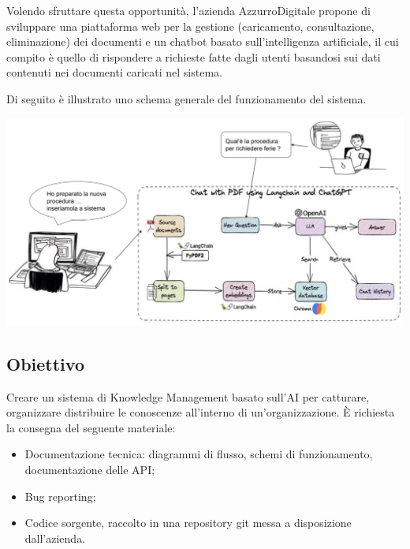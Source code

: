 \documentclass{article}
\begin{document}
Volendo sfruttare questa opportunità, l’azienda AzzurroDigitale propone di sviluppare una piattaforma web per la gestione (caricamento, consultazione, eliminazione) dei documenti e un chatbot basato sull’intelligenza artificiale, il cui compito è quello di rispondere a richieste fatte dagli utenti basandosi sui dati contenuti nei documenti caricati nel sistema.


Di seguito è illustrato uno schema generale del funzionamento del sistema.

\includegraphics[width=1\textwidth]{Img_AD.png}

\subsection{Obiettivo}
Creare un sistema di Knowledge Management basato sull’AI per catturare, organizzare distribuire le conoscenze all'interno di un'organizzazione.
È richiesta la consegna del seguente materiale:
\begin{itemize}
    \item Documentazione tecnica: diagrammi di flusso, schemi di funzionamento, documentazione delle API;
    \item Bug reporting;
    \item Codice sorgente, raccolto in una repository git messa a disposizione dall’azienda.
\end{itemize}
\end{document}
